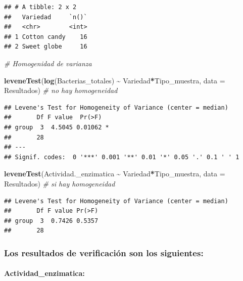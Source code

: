 \documentclass[
]{article}
\newenvironment{Shaded}{\begin{snugshade}}{\end{snugshade}}
\newcommand{\AttributeTok}[1]{\textcolor[rgb]{0.13,0.29,0.53}{#1}}
\newcommand{\CommentTok}[1]{\textcolor[rgb]{0.56,0.35,0.01}{\textit{#1}}}
\newcommand{\FunctionTok}[1]{\textcolor[rgb]{0.13,0.29,0.53}{\textbf{#1}}}
\newcommand{\NormalTok}[1]{#1}
\newcommand{\SpecialCharTok}[1]{\textcolor[rgb]{0.81,0.36,0.00}{\textbf{#1}}}
\begin{document}
\begin{verbatim}
## # A tibble: 2 x 2
##   Variedad     `n()`
##   <chr>        <int>
## 1 Cotton candy    16
## 2 Sweet globe     16
\end{verbatim}

\begin{Shaded}
\begin{Highlighting}[]
\CommentTok{\# Homogenidad de varianza}


\FunctionTok{leveneTest}\NormalTok{(}\FunctionTok{log}\NormalTok{(Bacterias\_totales) }\SpecialCharTok{\textasciitilde{}}\NormalTok{ Variedad}\SpecialCharTok{*}\NormalTok{Tipo\_muestra, }\AttributeTok{data =}\NormalTok{ Resultados) }\CommentTok{\# no hay homogeneidad}
\end{Highlighting}
\end{Shaded}

\begin{verbatim}
## Levene's Test for Homogeneity of Variance (center = median)
##       Df F value  Pr(>F)  
## group  3  4.5045 0.01062 *
##       28                  
## ---
## Signif. codes:  0 '***' 0.001 '**' 0.01 '*' 0.05 '.' 0.1 ' ' 1
\end{verbatim}

\begin{Shaded}
\begin{Highlighting}[]
\FunctionTok{leveneTest}\NormalTok{(Actividad.\_enzimatica }\SpecialCharTok{\textasciitilde{}}\NormalTok{ Variedad}\SpecialCharTok{*}\NormalTok{Tipo\_muestra, }\AttributeTok{data =}\NormalTok{ Resultados) }\CommentTok{\# si hay homogeneidad}
\end{Highlighting}
\end{Shaded}

\begin{verbatim}
## Levene's Test for Homogeneity of Variance (center = median)
##       Df F value Pr(>F)
## group  3  0.7426 0.5357
##       28
\end{verbatim}

\hypertarget{los-resultados-de-verificaciuxf3n-son-los-siguientes}{%
\subsubsection{Los resultados de verificación son los
siguientes:}\label{los-resultados-de-verificaciuxf3n-son-los-siguientes}}

\hypertarget{actividad_enzimatica}{%
\paragraph{\texorpdfstring{\textbf{Actividad\_enzimatica}:}{Actividad\_enzimatica:}}\label{actividad_enzimatica}}
\end{document}
